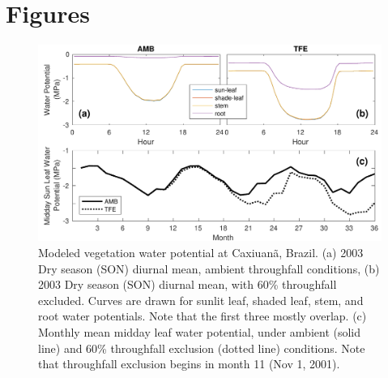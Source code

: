 \documentclass[draft,linenumbers]{agujournal}
\begin{document}
\section{Figures}
  \begin{figure}[h]
     \centering
     \includegraphics[width=30pc]{../figs2/fig2.pdf}
     \caption{Modeled vegetation water potential at  Caxiuan\~a, Brazil.
     (a) 2003 Dry season (SON) diurnal mean, ambient throughfall conditions,
     (b) 2003 Dry season (SON) diurnal mean, with 60\% throughfall excluded.
     Curves are drawn for sunlit leaf, shaded leaf, stem, and root water potentials. Note that the first three mostly overlap.
     (c) Monthly mean midday leaf water potential, under ambient (solid line) and 60\% throughfall exclusion (dotted line) conditions.
     Note that throughfall exclusion begins in month 11 (Nov 1, 2001).
     }
     \label{fig:vwp}
  \end{figure}
  
\end{document}
